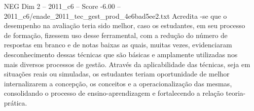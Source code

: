 \begin{textsample}{NEG Dim 2 – 2011\_c6 – Score -6.00 – 2011\_c6/enade\_2011\_tec\_gest\_prod\_4e6bad5ee2.txt}
Acredita -se que o desempenho na avaliação teria sido melhor, caso os estudantes, em seu processo de formação, fizessem uso desse ferramental, com a redução do número de respostas em branco e de notas baixas as quais, muitas vezes, evidenciaram desconhecimento dessas técnicas que são básicas e amplamente utilizadas nos mais diversos processos de gestão.
Através da aplicabilidade das técnicas, seja em situações reais ou simuladas, os estudantes teriam oportunidade de melhor internalizarem a concepção, os conceitos e a operacionalização das mesmas, consolidando o processo de ensino-aprendizagem e fortalecendo a relação teoria-prática.

\end{textsample}
